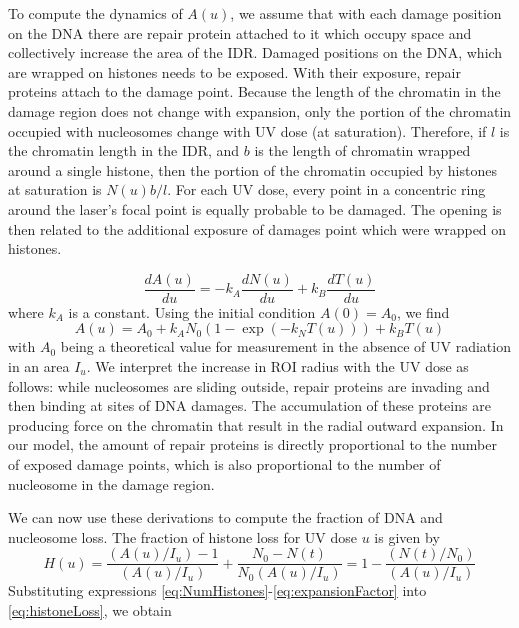 \documentclass[12pt]{article}
\begin{document}
To compute the dynamics of $A(u)$, we assume that with each damage position on the DNA there are repair protein attached to it which occupy space and collectively increase the area of the IDR. Damaged positions on the DNA, which are wrapped on histones needs to be exposed. With their exposure, repair proteins attach to the damage point. Because the length of the chromatin in the damage region does not change with expansion, only the portion of the chromatin occupied with nucleosomes change with UV dose (at saturation). Therefore, if $l$ is the chromatin length in the IDR, and $b$ is the length of chromatin wrapped around a single histone, then the portion of the chromatin occupied by histones at saturation is $N(u)b/l$. For each UV dose, every point in a concentric ring around the laser's focal point is equally probable to be damaged. The opening is then related to the additional exposure of damages point which were wrapped on histones. 

\begin{equation}\label{dralpha}
\frac{dA(u)}{du}=-k_A\frac{dN(u)}{du}+k_B\frac{dT(u)}{du}
\end{equation}
where $k_A$ is a constant. Using the initial condition $A(0)=A_0$, we find 
\begin{equation}\label{eq:expansionFactor}
A(u) = A_0 +k_AN_0\left(1-\exp\left(-k_NT(u)\right)\right) +k_BT(u)
\end{equation}
with $A_0$ being a theoretical value for measurement in the absence of UV radiation in an area $I_u$. We interpret the increase in ROI radius with the UV dose as follows: while nucleosomes are sliding outside, repair proteins are invading and then binding at sites of DNA damages. The accumulation of these proteins are producing force on the chromatin that result in the radial outward expansion. In our model, the amount of repair proteins is directly proportional to the number of exposed damage points, which is also proportional to the number of nucleosome in the damage region.

We can now use these derivations to compute the fraction of DNA and nucleosome loss. The fraction of histone loss for UV dose $u$ is given by
\begin{equation}\label{eq:histoneLoss}
H(u) = \frac{(A(u)/I_u)-1}{(A(u)/I_u)} +\frac{N_0-N(t)}{N_0(A(u)/I_u)}=1-\frac{(N(t)/N_0)}{(A(u)/I_u)}
\end{equation}
Substituting expressions \ref{eq:NumHistones}-\ref{eq:expansionFactor} into \ref{eq:histoneLoss}, we obtain
\end{document}
